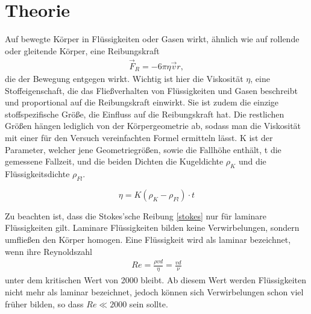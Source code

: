 \newpage					%




	\section{Theorie}
Auf bewegte Körper in Flüssigkeiten oder Gasen wirkt, ähnlich wie auf rollende oder gleitende Körper, eine Reibungskraft
\begin{align}
\vec F_R=-6 \pi \eta \vec{v} r,
\label{stokes}
\end{align}
 die der Bewegung entgegen wirkt. Wichtig ist hier die Viskosität $\eta $, eine Stoffeigenschaft, die das Fließverhalten von Flüssigkeiten und Gasen beschreibt und proportional auf die Reibungskraft einwirkt. Sie ist zudem die einzige stoffspezifische Größe, die Einfluss auf die Reibungskraft hat. Die restlichen Größen hängen lediglich von der Körpergeometrie ab, sodass man die Viskosität mit einer für den Versuch vereinfachten Formel ermitteln lässt. K ist der Parameter, welcher jene Geometriegrößen, sowie die Fallhöhe enthält, t die gemessene Fallzeit, und die beiden Dichten die Kugeldichte $\rho_K$ und die Flüssigkeitsdichte $\rho_{Fl}$.
 
 \begin{equation}
  \eta = K(\rho_K - \rho_{Fl})\cdot t
  \label{viskos}
 \end{equation}

 Zu beachten ist, dass die Stokes'sche Reibung \eqref{stokes} nur für laminare Flüssigkeiten gilt. Laminare Flüssigkeiten bilden keine Verwirbelungen, sondern umfließen den Körper homogen. Eine Flüssigkeit wird als laminar bezeichnet, wenn ihre Reynoldszahl
 \begin{align}
 Re= \frac{\rho v d}{\eta} = \frac{v d}{\nu}
 \label{rey}
 \end{align}
unter dem kritischen Wert von 2000 bleibt. Ab diesem Wert werden Flüssigkeiten nicht mehr als laminar bezeichnet, jedoch können sich Verwirbelungen schon viel früher bilden, so dass  $Re \ll 2000$ sein sollte. 
